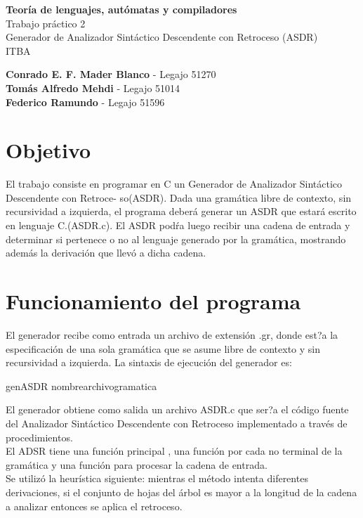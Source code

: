 \documentclass{article}
\begin{document}
\begin{center}
{\LARGE \textbf{
Teor\'ia de lenguajes, aut\'omatas y compiladores\\}
Trabajo pr\'actico 2\\
Generador de Analizador Sint\'actico Descendente con Retroceso (ASDR)\\
ITBA\\
}
\end{center}

\vspace{12cm}
\begin{flushright}

 \textbf{Conrado E. F. Mader Blanco} - Legajo 51270\\
 \textbf{Tom\'as Alfredo Mehdi} - Legajo 51014\\
 \textbf{Federico Ramundo} - Legajo 51596 
 
 \end{flushright}
\newpage
\tableofcontents
\newpage
\section{Objetivo}
El trabajo consiste en programar en C un Generador de Analizador Sint\'actico Descendente con Retroce- so(ASDR). Dada una gram\'atica libre de contexto, sin recursividad a izquierda, el programa deber\'a generar un ASDR que estar\'a escrito en lenguaje C.(ASDR.c). El ASDR pod\'ra luego recibir una cadena de entrada y determinar si pertenece o no al lenguaje generado por la gram\'atica, mostrando adem\'as la derivaci\'on que llev\'o a dicha cadena.

\section{Funcionamiento del programa}
El generador recibe como entrada un archivo de extensi\'on .gr, donde est?a la especificaci\'on de una sola gram\'atica que se asume libre de contexto y sin recursividad a izquierda. La sintaxis de ejecuci\'on del generador es:
\begin{center}
genASDR nombrearchivogramatica
\end{center}
El generador obtiene como salida un archivo ASDR.c que ser?a el c\'odigo fuente del Analizador Sint\'actico Descendente con Retroceso implementado a trav\'es de procedimientos.\\

El ADSR tiene una funci\'on principal , una funci\'on por cada no terminal de la gram\'atica y una funci\'on para procesar la cadena de entrada.\\
Se utiliz\'o la heur\'istica siguiente: mientras el m\'etodo intenta diferentes derivaciones, si el conjunto de hojas del \'arbol es mayor a la longitud de la cadena a analizar entonces se aplica el retroceso.
\end{document}
